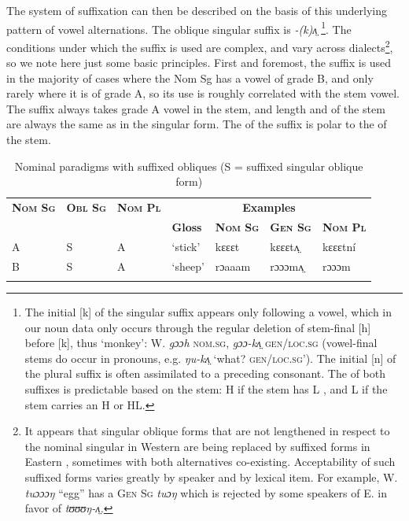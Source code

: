 \documentclass[output=paper
,newtxmath
,modfonts
,nonflat]{langsci/langscibook}
\begin{document}
The system of suffixation can then be described on the basis of this underlying pattern of vowel alternations. The oblique singular suffix is \textit{{}-(k)}\textit{ʌ̤} \footnote{The initial [k] of the singular suffix appears only following a vowel, which in our noun data only occurs through the regular deletion of stem-final [h] before [k], thus ‘monkey’: W.  \textit{gɔɔh} \textsc{nom.sg}, \textit{gɔɔ-kʌ̤} \textsc{gen/loc.sg} (vowel-final stems do occur in pronouns, e.g. \textit{ŋu-kʌ̤} ‘what? \textsc{gen/loc.sg’}). The initial [n] of the plural suffix is often assimilated to a preceding  consonant. The  of both suffixes is predictable based on the stem: H if the stem has L , and L if the stem carries an H or HL.}.  The conditions under which the suffix is used are complex, and vary across dialects\footnote{It appears that singular oblique forms that are not lengthened in respect to the nominal singular in Western  are being replaced by suffixed forms in Eastern , sometimes with both alternatives co-existing. Acceptability of such suffixed forms varies greatly by speaker and by lexical item.  For example, W.   \textit{tuɔɔɔŋ}  “egg” has a \textsc{Gen Sg} \textit{tuɔŋ} which is rejected by some speakers of E.  in favor of \textit{tʊʊʊŋ-ʌ̤.}}, so we note here just some basic principles.  First and foremost, the suffix is used in the majority of cases where the Nom Sg has a vowel of grade B, and only rarely where it is of grade A, so its use is roughly correlated with the stem vowel. The suffix always takes grade A vowel in the stem, and length and  of the stem are always the same as in the  singular form.  The  of the suffix is polar to the  of the stem.

\begin{table}
\begin{tabularx}{\textwidth}{XXXXXXX}
\lsptoprule

\bfseries\scshape Nom Sg & \bfseries\scshape Obl Sg & \bfseries\scshape Nom Pl & \multicolumn{4}{c}{\bfseries Examples}\\
\cmidrule{4-7}
&  &  & \bfseries Gloss & \bfseries\scshape Nom Sg & \bfseries\scshape Gen Sg & \bfseries\scshape Nom Pl\\
\midrule
A & S & A & ‘stick’ & kɛɛɛt & kɛɛɛtʌ̤ & kɛɛɛtní\\
B & S & A & ‘sheep’ & rɔaaam & rɔɔɔmʌ̤ & rɔɔɔm\\
\lspbottomrule
\end{tabularx}
\caption{Nominal paradigms with suffixed obliques  (S = suffixed singular oblique form)}
\label{tab:monich:18}
\end{table}
\end{document}

